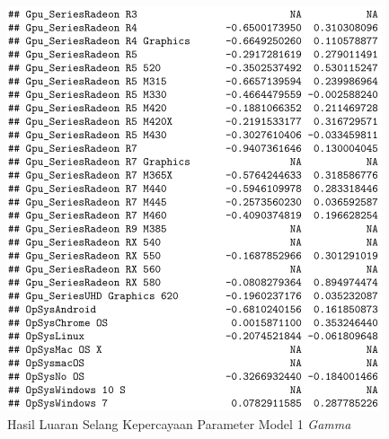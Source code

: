\documentclass[12pt]{article}
\begin{document}
\begin{figure}[h!]
    \centering
    \includegraphics{Model_1_CI(5_5).png}
    \caption{Hasil Luaran Selang Kepercayaan Parameter Model 1 \textit{Gamma}}
    \label{fig:CI15}
\end{figure}
\end{document}
